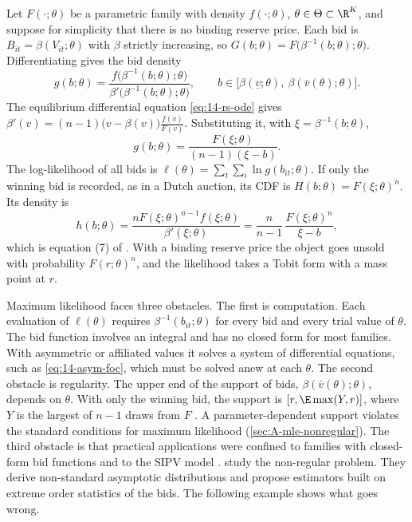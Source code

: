 Let $F(\cdot;\theta)$ be a parametric family with density $f(\cdot;\theta)$, $\theta\in\Theta\subset\R^K$, and suppose
for simplicity that there is no binding reserve price. Each bid is $B_{it}=\beta(V_{it};\theta)$ with $\beta$ strictly
increasing, so $G(b;\theta)=F\big(\beta^{-1}(b;\theta);\theta\big)$. Differentiating gives the bid density
\begin{equation}\label{eq:15-bid-density}
g(b;\theta)=\frac{f\big(\beta^{-1}(b;\theta);\theta\big)}{\beta'\big(\beta^{-1}(b;\theta);\theta\big)},
\qquad b\in\big[\beta(\underline v;\theta),\ \beta(\bar v(\theta);\theta)\big].
\end{equation}
The equilibrium differential equation \eqref{eq:14-rs-ode} gives $\beta'(v)=(n-1)\big(v-\beta(v)\big)\frac{f(v)}{F(v)}$.
Substituting it, with $\xi=\beta^{-1}(b;\theta)$,
\[
g(b;\theta)=\frac{F(\xi;\theta)}{(n-1)(\xi-b)} .
\]
The log-likelihood of all bids is $\ell(\theta)=\sum_t\sum_i\ln g(b_{it};\theta)$. If only the winning bid is
recorded, as in a Dutch auction, its CDF is $H(b;\theta)=F(\xi;\theta)^n$. Its density is
\[
h(b;\theta)=\frac{nF(\xi;\theta)^{n-1}f(\xi;\theta)}{\beta'(\xi;\theta)}=\frac{n}{n-1}\,\frac{F(\xi;\theta)^n}{\xi-b},
\]
which is equation (7) of \citet{LaffontOssardVuong1995}. With a binding reserve price the object goes unsold with
probability $F(r;\theta)^n$, and the likelihood takes a Tobit form with a mass point at $r$.

Maximum likelihood faces three obstacles. The first is computation. Each evaluation of $\ell(\theta)$ requires
$\beta^{-1}(b_{it};\theta)$ for every bid and every trial value of $\theta$. The bid function involves an integral and
has no closed form for most families. With asymmetric or affiliated values it solves a system of differential
equations, such as \eqref{eq:14-asym-foc}, which must be solved anew at each $\theta$. The second obstacle is regularity. The
upper end of the support of bids, $\beta(\bar v(\theta);\theta)$, depends on $\theta$. With only the winning bid, the
support is $[r,\E\max(Y,r)]$, where $Y$ is the largest of $n-1$ draws from $F$ \citep[p.~958]{LaffontOssardVuong1995}.
A parameter-dependent support violates the standard conditions for maximum likelihood (\cref{sec:A-mle-nonregular}).
The third obstacle is that practical applications were confined to families with closed-form bid functions and to
the SIPV model \citep[Section~3.2]{AtheyHaile2007}. \citet{DonaldPaarsch1993,DonaldPaarsch1996} study the
non-regular problem. They derive non-standard asymptotic distributions and propose estimators built on extreme order
statistics of the bids. The following example shows what goes wrong.


